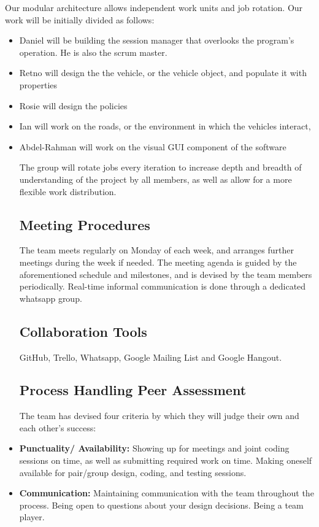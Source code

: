 \documentclass[11pt]{article}
\begin{document}
Our modular architecture allows independent work units and job rotation. Our work will be initially divided as follows:	\begin{itemize}
		\item Daniel will be building the session manager that overlooks the program’s operation. He is also the scrum master.
		\item Retno will design the the vehicle, or the vehicle object, and populate it with properties
		\item Rosie will design the policies
		\item Ian will work on the roads, or the environment in which the vehicles interact,
		\item Abdel-Rahman will work on the visual GUI component of the software

The group will rotate jobs every iteration to increase depth and breadth of understanding of the project by all members, as well as allow for a more flexible work distribution. 
\subsection{Meeting Procedures}


The team meets regularly on Monday of each week, and arranges further meetings during the week if needed. The meeting agenda is guided by the aforementioned schedule and milestones, and is devised by the team members periodically. Real-time informal communication is done through a dedicated whatsapp group.

\subsection{Collaboration Tools}

GitHub, Trello, Whatsapp, Google Mailing List and Google Hangout.


\subsection{Process Handling Peer Assessment}
The team has devised four criteria by which they will judge their own
and each other's success:

	\item \textbf{Punctuality/ Availability:}
	Showing up for meetings and joint coding sessions on time, as well as submitting required work on time.
	Making oneself available for pair/group design, coding, and testing sessions.
	
	\item \textbf{Communication:}
	 Maintaining communication with the team throughout the process. Being open to questions about your design decisions. Being a team player.
	

\end{itemize}
\end{document}
